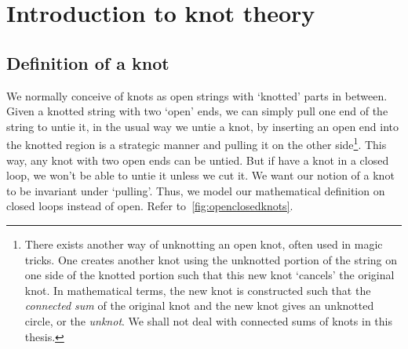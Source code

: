 \chapter{Introduction to knot theory}

\section{Definition of a knot}

We normally conceive of knots as open strings with `knotted' parts in between. Given a knotted string with two `open' ends, we can simply pull one end of the string to untie it, in the usual way we untie a knot, by inserting an open end into the knotted region is a strategic manner and pulling it on the other side\footnote{There exists another way of unknotting an open knot, often used in magic tricks. One creates another knot using the unknotted portion of the string on one side of the knotted portion such that this new knot `cancels' the original knot. In mathematical terms, the new knot is constructed such that the \textit{connected sum} of the original knot and the new knot gives an unknotted circle, or the \textit{unknot}. We shall not deal with connected sums of knots in this thesis.}. This way, any knot with two open ends can be untied. But if have a knot in a closed loop, we won't be able to untie it unless we cut it. We want our notion of a knot to be invariant under `pulling'. Thus, we model our mathematical definition on closed loops instead of open. Refer to~\cref{fig:openclosedknots}.

